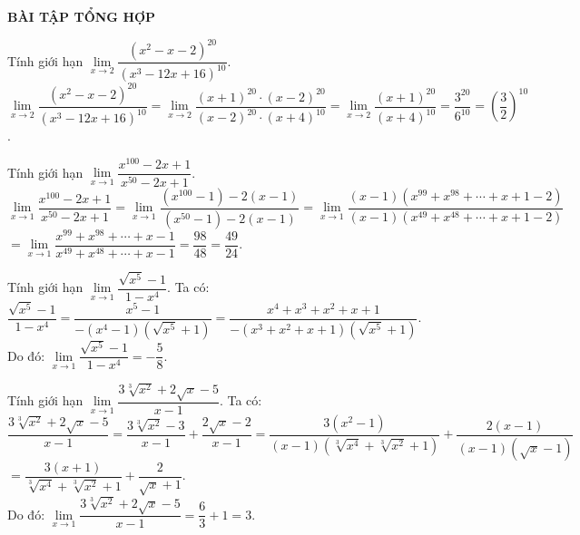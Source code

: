 \begin{center}
\textbf{BÀI TẬP TỔNG HỢP}
\end{center}

\begin{bt}%
Tính giới hạn $\lim\limits_{x \to 2}\dfrac{(x^2 - x - 2)^{20}}{(x^3 - 12x + 16)^{10}}$.
\loigiai
{
$\lim\limits_{x \to 2}\dfrac{(x^2 - x - 2)^{20}}{(x^3 - 12x + 16)^{10}} = \lim\limits_{x \to 2}\dfrac{(x+1)^{20} \cdot (x-2)^{20}}{(x-2)^{20} \cdot (x+4)^{10}} = \lim\limits_{x \to 2}\dfrac{(x+1)^{20}}{(x+4)^{10}} = \dfrac{3^{20}}{6^{10}} = \left(\dfrac{3}{2}\right)^{10}$.
}
\end{bt}


\begin{bt}%
Tính giới hạn $\lim\limits_{x \to 1}\dfrac{x^{100} - 2x + 1}{x^{50} - 2x + 1}$.
\loigiai
{
$\lim\limits_{x \to 1}\dfrac{x^{100} - 2x + 1}{x^{50} - 2x + 1} = \lim\limits_{x \to 1}\dfrac{(x^{100}-1)-2(x-1)}{(x^{50}-1)-2(x-1)} = \lim\limits_{x \to 1}\dfrac{(x-1)(x^{99}+x^{98}+ \cdots + x +1 - 2)}{(x-1)(x^{49}+x^{48}+ \cdots + x +1 - 2)}$\\
$= \lim\limits_{x \to 1}\dfrac{x^{99}+x^{98}+ \cdots + x - 1}{x^{49}+x^{48}+ \cdots + x - 1} = \dfrac{98}{48} = \dfrac{49}{24}$.
}
\end{bt}


\begin{bt}%
Tính giới hạn $\lim\limits_{x \to 1} \dfrac{\sqrt{x^5} - 1}{1 - x^4}$.
\loigiai
{
Ta có:\\
$\dfrac{\sqrt{x^5} - 1}{1 - x^4} = \dfrac{x^5 - 1}{-(x^4 - 1)\left(\sqrt{x^5} + 1\right)} = \dfrac{x^4 + x^3 + x^2 + x + 1}{-(x^3 + x^2 + x + 1)\left(\sqrt{x^5} + 1\right)}$.\\
Do đó: $\lim\limits_{x \to 1} \dfrac{\sqrt{x^5} - 1}{1 - x^4} = -\dfrac{5}{8}$.
}
\end{bt}


\begin{bt}%
Tính giới hạn $\lim\limits_{x \to 1}\dfrac{3\sqrt[3]{x^2} + 2\sqrt{x} - 5}{x - 1}$.
\loigiai
{
Ta có:\\
$\dfrac{3\sqrt[3]{x^2} + 2\sqrt{x} - 5}{x - 1} = \dfrac{3\sqrt[3]{x^2} - 3}{x - 1} + \dfrac{2\sqrt{x} - 2}{x - 1} = \dfrac{3(x^2 - 1)}{(x - 1)\left(\sqrt[3]{x^4} + \sqrt[3]{x^2} + 1\right)} + \dfrac{2(x-1)}{(x - 1)\left(\sqrt{x} - 1\right)}$\\
$= \dfrac{3(x+1)}{\sqrt[3]{x^4} + \sqrt[3]{x^2} + 1} + \dfrac{2}{\sqrt{x} + 1}$.\\
Do đó: $\lim\limits_{x \to 1}\dfrac{3\sqrt[3]{x^2} + 2\sqrt{x} - 5}{x - 1} = \dfrac{6}{3} + 1 = 3$.
}
\end{bt}


